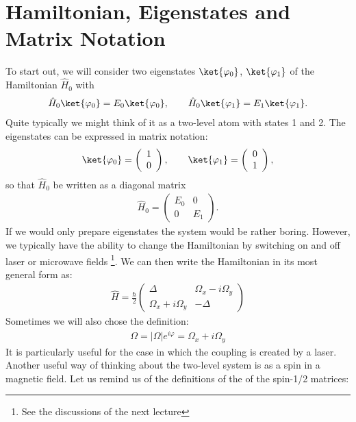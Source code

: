 \section{Hamiltonian, Eigenstates and Matrix Notation}

To start out, we will consider two eigenstates $\ket{\varphi_0}$, $\ket{\varphi_1}$ of the Hamiltonian $\hat{H}_0$ with
\begin{align}
 \hat{H}_0\ket{\varphi_0}=E_0\ket{\varphi_0}, \qquad \hat{H}_0\ket{\varphi_1}=E_1\ket{\varphi_1}.
\end{align}
Quite typically we might think of it as a two-level atom with states 1 and 2. The eigenstates can be expressed in matrix notation:
\begin{align}
 \ket{\varphi_0}=\left( \begin{array}{c} 1 \\ 0 \end{array} \right), \qquad \ket{\varphi_1}=\left( \begin{array}{c} 0 \\ 1 \end{array} \right),
\end{align}
so that $\hat{H}_0$ be written as a diagonal matrix
\begin{align}
    \hat{H}_0 = \left(\begin{array}{cc} E_0 & 0 \\ 0 & E_1 \end{array}\right).
\end{align}
If we would only prepare eigenstates the system would be rather boring. However, we typically have the ability to change the Hamiltonian by switching on and off laser or microwave fields \footnote{See the discussions of the next lecture}. We can then write the Hamiltonian in its most general form as:
\begin{align}\label{Eq:TwoLevelGeneral}
\hat{H} = \frac{\hbar}{2}\left( \begin{array}{cc} \Delta  & \Omega_x - i\Omega_y\\ \Omega_x +i\Omega_y & -\Delta \end{array} \right)
\end{align}
Sometimes we will also chose the definition:
\begin{align}
\Omega = |\Omega| e^{i\varphi}=\Omega_x + i\Omega_y
\end{align}
It is particularly useful for the case in which the coupling is created by a laser. Another useful way of thinking about the two-level system is as a spin in a magnetic field. Let us remind us of the definitions of the of the spin-1/2 matrices:
